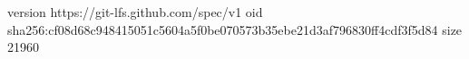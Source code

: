 version https://git-lfs.github.com/spec/v1
oid sha256:cf08d68c948415051c5604a5f0be070573b35ebe21d3af796830ff4cdf3f5d84
size 21960
